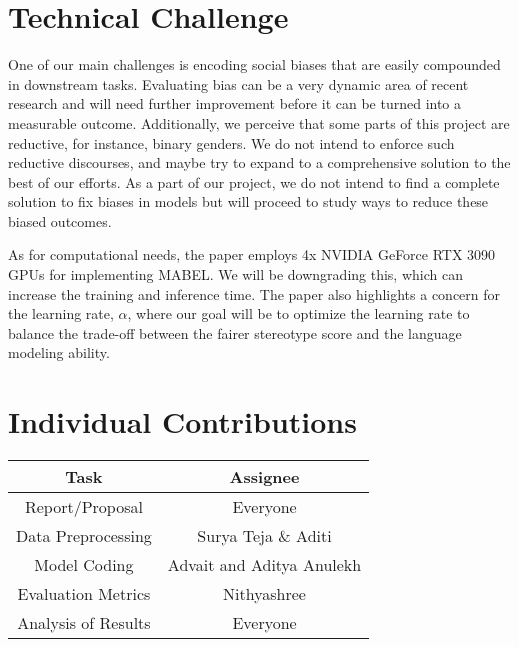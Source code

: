 \documentclass[11pt]{article}
\begin{document}
\section{Technical Challenge}
One of our main challenges is encoding social biases that are easily compounded in downstream tasks. Evaluating bias can be a very dynamic area of recent research and will need further improvement before it can be turned into a measurable outcome. Additionally, we perceive that some parts of this project are reductive, for instance, binary genders. We do not intend to enforce such reductive discourses, and maybe try to expand to a comprehensive solution to the best of our efforts. As a part of our project, we do not intend to find a complete solution to fix biases in models but will proceed to study ways to reduce these biased outcomes. 

As for computational needs, the paper employs 4x NVIDIA GeForce RTX 3090 GPUs for implementing MABEL. We will be downgrading this, which can increase the training and inference time. The paper also highlights a concern for the learning rate, $\alpha$, where our goal will be to optimize the learning rate to balance the trade-off between the fairer stereotype score and the language modeling ability. 

\section{Individual Contributions}

\begin{table}[h]
\begin{tabular}{|c|c|}
\hline
\textbf{Task}                & \textbf{Assignee}                            \\ \hline
Report/Proposal     & Everyone                              \\ \hline
Data Preprocessing  & Surya Teja \& Aditi     \\ \hline
Model Coding        & Advait and Aditya Anulekh \\ \hline
Evaluation Metrics  & Nithyashree                   \\ \hline
Analysis of Results & Everyone                              \\ \hline
\end{tabular}
\end{table}





\appendix
\end{document}
